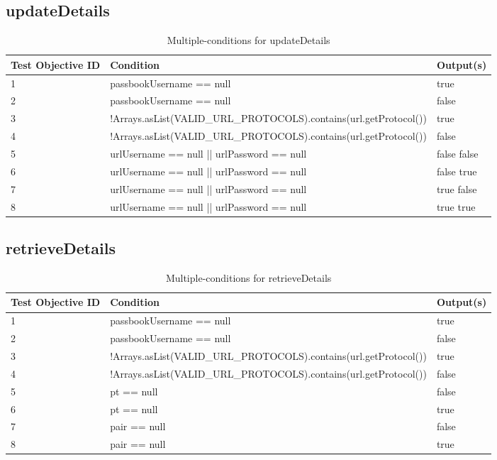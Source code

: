 \documentclass{article}
\begin{document}
\subsection{updateDetails}
\begin{longtable}{|p{2cm}|p{11cm}|p{2cm}|}
\caption{Multiple-conditions for updateDetails}\\
\hline 
Test Objective ID&Condition&Output(s)\\
\hline  
1&passbookUsername == null&true\\
\hline
2&passbookUsername == null&false\\
\hline
3&!Arrays.asList(VALID\_URL\_PROTOCOLS).contains(url.getProtocol())&true\\
\hline
4&!Arrays.asList(VALID\_URL\_PROTOCOLS).contains(url.getProtocol())&false\\
\hline
5&urlUsername == null || urlPassword == null&false false\\
\hline
6&urlUsername == null || urlPassword == null&false true\\
\hline
7&urlUsername == null || urlPassword == null&true false\\
\hline
8&urlUsername == null || urlPassword == null&true true\\
\hline
\end{longtable}

\subsection{retrieveDetails}
\begin{longtable}{|p{2cm}|p{11cm}|p{2cm}|}
\caption{Multiple-conditions for retrieveDetails}\\
\hline 
Test Objective ID&Condition&Output(s)\\
\hline  
1&passbookUsername == null&true\\
\hline
2&passbookUsername == null&false\\
\hline
3&!Arrays.asList(VALID\_URL\_PROTOCOLS).contains(url.getProtocol())&true\\
\hline
4&!Arrays.asList(VALID\_URL\_PROTOCOLS).contains(url.getProtocol())&false\\
\hline
5&pt == null&false\\
\hline
6&pt == null&true\\
\hline
7&pair == null&false\\
\hline
8&pair == null&true\\
\hline
\end{longtable}

\enddocument
\end{document}
